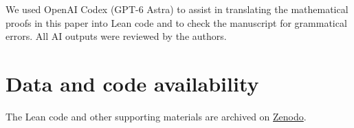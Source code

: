 \begin{acknowledgments}
We used OpenAI Codex (GPT-6 Astra) to assist in translating the mathematical proofs in this paper into Lean code and to check the manuscript for grammatical errors. All AI outputs were reviewed by the authors.
\end{acknowledgments}

\section*{Data and code availability}
The Lean code and other supporting materials are archived on \href{https://doi.org/10.5281/zenodo.23882488}{Zenodo}.
